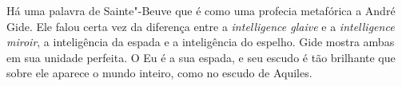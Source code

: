 Há uma palavra de Sainte"-Beuve que é como uma profecia metafórica a
André Gide. Ele falou certa vez da diferença entre a \emph{intelligence glaive} e a
\emph{intelligence miroir}, a inteligência da espada e a inteligência do espelho.
Gide mostra ambas em sua unidade perfeita. O Eu é a sua espada, e seu
escudo é tão brilhante que sobre ele aparece o mundo inteiro, como no escudo de Aquiles.
